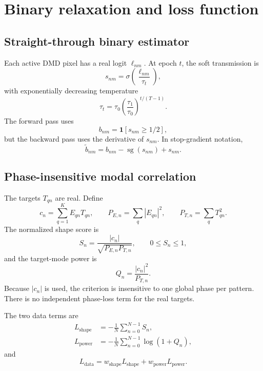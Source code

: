 \documentclass[11pt,a4paper]{article}
\begin{document}
\section{Binary relaxation and loss function}
\subsection{Straight-through binary estimator}
Each active DMD pixel has a real logit $\ell_{nm}$. At epoch $t$, the soft transmission is
\begin{equation}
 s_{nm}=\sigma\!\left(\frac{\ell_{nm}}{\tau_t}\right),
\end{equation}
with exponentially decreasing temperature
\begin{equation}
 \tau_t=\tau_0\left(\frac{\tau_1}{\tau_0}\right)^{t/(T-1)}.
\end{equation}
The forward pass uses
\begin{equation}
 b_{nm}=\mathbf 1[s_{nm}\geq 1/2],
\end{equation}
but the backward pass uses the derivative of $s_{nm}$. In stop-gradient notation,
\begin{equation}
 \widetilde b_{nm}=b_{nm}-\operatorname{sg}(s_{nm})+s_{nm}.
 \label{eq:ste}
\end{equation}

\subsection{Phase-insensitive modal correlation}
The targets $T_{qn}$ are real. Define
\begin{equation}
 c_n=\sum_{q=1}^{K} E_{qn}T_{qn},\qquad
 P_{E,n}=\sum_q |E_{qn}|^2,\qquad
 P_{T,n}=\sum_q T_{qn}^2.
\end{equation}
The normalized shape score is
\begin{equation}
 S_n=\frac{|c_n|}{\sqrt{P_{E,n}P_{T,n}}},\qquad 0\leq S_n\leq1,
\end{equation}
and the target-mode power is
\begin{equation}
 Q_n=\frac{|c_n|^2}{P_{T,n}}.
\end{equation}
Because $|c_n|$ is used, the criterion is insensitive to one global phase per pattern. There is no independent phase-loss term for the real targets.

The two data terms are
\begin{align}
 L_{\mathrm{shape}}&=-\frac1N\sum_{n=0}^{N-1}S_n,\\
 L_{\mathrm{power}}&=-\frac1N\sum_{n=0}^{N-1}\log(1+Q_n),
\end{align}
and
\begin{equation}
 L_{\mathrm{data}}=w_{\mathrm{shape}}L_{\mathrm{shape}}+
 w_{\mathrm{power}}L_{\mathrm{power}}.
\end{equation}
\end{document}
